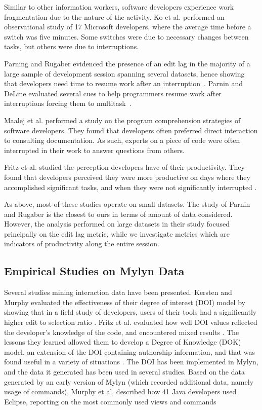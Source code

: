 \documentclass[times]{smrauth}
\begin{document}
Similar to other information workers, software developers experience work fragmentation due to the nature of the activity. Ko et al. \cite{KDV07} performed an observational study of 17 Microsoft developers, where the average time before a switch was five minutes. Some switches were due to necessary changes between tasks, but others were due to interruptions. 

Parning and Rugaber evidenced the presence of an edit lag in the majority of a large sample of development session spanning several datasets, hence showing that developers need time to resume work after an interruption~\cite{PR11}. Parnin and DeLine evaluated several cues  to help programmers resume work after interruptions forcing them to multitask~\cite{PD10}.

Maalej et al. \cite{MTRK14} performed a study on the program comprehension strategies of software developers. They found that developers often preferred direct interaction to consulting documentation. As such, experts on a piece of code were often interrupted in their work to answer questions from others.

Fritz et al. studied the perception developers have of their productivity. They found that developers perceived they were more productive on days where they accomplished significant tasks, and when they were not significantly interrupted \cite{MFMZ14}.

As above, most of these studies operate on small datasets. The study of Parnin and Rugaber is the closest to ours in terms of amount of data considered. However, the analysis performed on large datasets in their study focused principally on the edit lag metric, while we investigate metrics which are indicators of productivity along the entire session.


\subsection{Empirical Studies on Mylyn Data}

Several studies mining interaction data have been presented. Kersten and Murphy evaluated the effectiveness of their degree of interest (DOI) model by showing that in a field study of developers, users of their tools had a significantly higher edit to selection ratio \cite{KM06}. Fritz et al. evaluated how well DOI values reflected the developer’s knowledge of the code, and encountered mixed results \cite{FMH07}. The lessons they learned allowed them to develop a Degree of Knowledge (DOK) model, an extension of the DOI containing authorship information, and that was found useful in a variety of situations \cite{FOMM10}. The DOI has been implemented in Mylyn, and the data it generated has been used in several studies. Based on the data generated by an early version of Mylyn (which recorded additional data, namely usage of commands), Murphy et al. described how 41 Java developers used Eclipse, reporting on the most commonly used views and commands \cite{MKF06}
\end{document}
